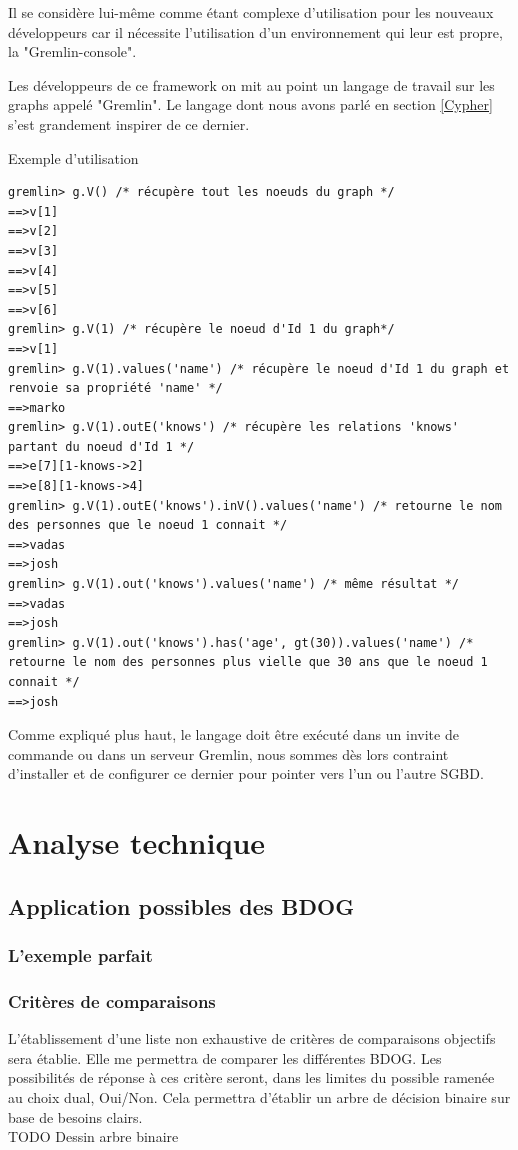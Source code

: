 \documentclass[a4paper,fleqn,12pt]{report}
\begin{document}
Il se considère lui-même comme étant complexe d'utilisation pour les nouveaux développeurs car il nécessite l'utilisation d'un environnement qui leur est propre, la "Gremlin-console".

Les développeurs de ce framework on mit au point un langage de travail sur les graphs appelé "Gremlin". Le langage dont nous avons parlé en section \ref{Cypher} s'est grandement inspirer de ce dernier.

Exemple d'utilisation 

\begin{lstlisting}
gremlin> g.V() /* récupère tout les noeuds du graph */
==>v[1]
==>v[2]
==>v[3]
==>v[4]
==>v[5]
==>v[6]
gremlin> g.V(1) /* récupère le noeud d'Id 1 du graph*/
==>v[1]
gremlin> g.V(1).values('name') /* récupère le noeud d'Id 1 du graph et renvoie sa propriété 'name' */
==>marko
gremlin> g.V(1).outE('knows') /* récupère les relations 'knows' partant du noeud d'Id 1 */
==>e[7][1-knows->2]
==>e[8][1-knows->4]
gremlin> g.V(1).outE('knows').inV().values('name') /* retourne le nom des personnes que le noeud 1 connait */
==>vadas
==>josh
gremlin> g.V(1).out('knows').values('name') /* même résultat */
==>vadas
==>josh
gremlin> g.V(1).out('knows').has('age', gt(30)).values('name') /* retourne le nom des personnes plus vielle que 30 ans que le noeud 1 connait */
==>josh
\end{lstlisting}

Comme expliqué plus haut, le langage doit être exécuté dans un invite de commande ou dans un serveur Gremlin, nous sommes dès lors contraint d'installer et de configurer ce dernier pour pointer vers l'un ou l'autre SGBD.



\part{Analyse technique}
\chapter{Application possibles des BDOG}

\section{L'exemple parfait}



\section{Critères de comparaisons}
L'établissement d'une liste non exhaustive de critères de comparaisons objectifs sera établie. Elle me permettra de comparer les différentes BDOG. Les possibilités de réponse à ces critère seront, dans les limites du possible ramenée au choix dual, Oui/Non. Cela permettra d'établir un arbre de décision binaire sur base de besoins clairs.\\TODO Dessin arbre binaire
\end{document}
